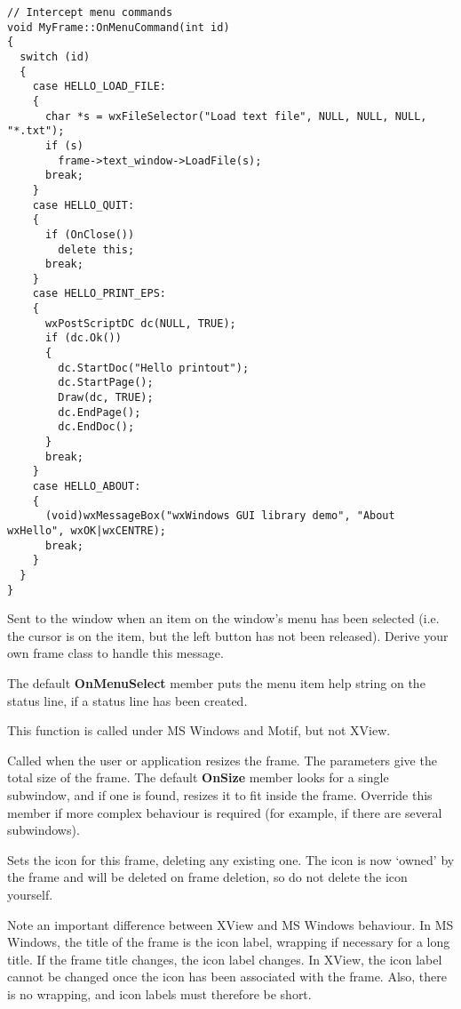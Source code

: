 \begin{verbatim}
// Intercept menu commands
void MyFrame::OnMenuCommand(int id)
{
  switch (id)
  {
    case HELLO_LOAD_FILE:
    {
      char *s = wxFileSelector("Load text file", NULL, NULL, NULL, "*.txt");
      if (s)
        frame->text_window->LoadFile(s);
      break;
    }
    case HELLO_QUIT:
    {
      if (OnClose())
        delete this;
      break;
    }
    case HELLO_PRINT_EPS:
    {
      wxPostScriptDC dc(NULL, TRUE);
      if (dc.Ok())
      {
        dc.StartDoc("Hello printout");
        dc.StartPage();
        Draw(dc, TRUE);
        dc.EndPage();
        dc.EndDoc();
      }
      break;
    }
    case HELLO_ABOUT:
    {
      (void)wxMessageBox("wxWindows GUI library demo", "About wxHello", wxOK|wxCENTRE);
      break;
    }
  }
}
\end{verbatim}

\label{wxframeonmenuselect}


Sent to the window when an item on the window's menu has been selected
(i.e. the cursor is on the item, but the left button has not been
released). Derive your own frame class to handle this message.

The default {\bf OnMenuSelect} member puts the menu item help string
on the status line, if a status line has been created.

This function is called under MS Windows and Motif, but not XView.

\label{wxframeonsize}


Called when the user or application resizes the frame. The parameters
give the total size of the frame. The default {\bf OnSize} member
looks for a single subwindow, and if one is found, resizes it to fit
inside the frame. Override this member if more complex behaviour
is required (for example, if there are several subwindows).



Sets the icon for this frame, deleting any existing one. The icon
is now `owned' by the frame and will be deleted on frame deletion,
so do not delete the icon yourself.

Note an important difference between XView and MS Windows behaviour. In
MS Windows, the title of the frame is the icon label, wrapping if
necessary for a long title. If the frame title changes, the icon label
changes. In XView, the icon label cannot be changed once the icon has
been associated with the frame.  Also, there is no wrapping, and icon
labels must therefore be short.

